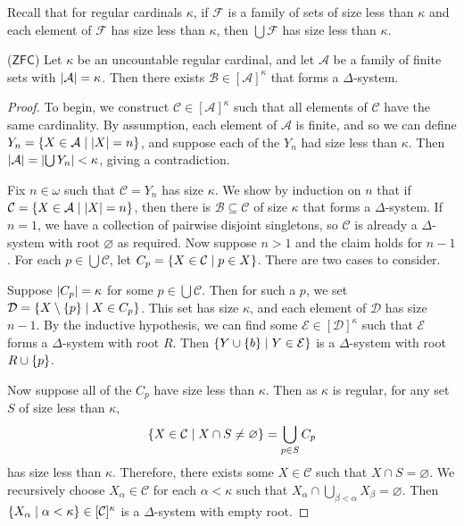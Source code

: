 Recall that for regular cardinals \( \kappa \), if \( \mathcal F \) is a family of sets of size less than \( \kappa \) and each element of \( \mathcal F \) has size less than \( \kappa \), then \( \bigcup \mathcal F \) has size less than \( \kappa \).
\begin{lemma}
    (\( \mathsf{ZFC} \))
    Let \( \kappa \) be an uncountable regular cardinal, and let \( \mathcal A \) be a family of finite sets with \( \abs{\mathcal A} = \kappa \).
    Then there exists \( \mathcal B \in [\mathcal A]^\kappa \) that forms a \( \Delta \)-system.
\end{lemma}
\begin{proof}
    To begin, we construct \( \mathcal C \in [\mathcal A]^\kappa \) such that all elements of \( \mathcal C \) have the same cardinality.
    By assumption, each element of \( \mathcal A \) is finite, and so we can define \( Y_n = \qty{X \in \mathcal A \mid \abs{X} = n} \), and suppose each of the \( Y_n \) had size less than \( \kappa \).
    Then \( \abs{\mathcal A} = \abs{\bigcup Y_n} < \kappa \), giving a contradiction.

    Fix \( n \in \omega \) such that \( \mathcal C = Y_n \) has size \( \kappa \).
    We show by induction on \( n \) that if \( \mathcal C = \qty{X \in \mathcal A \mid \abs{X} = n} \), then there is \( \mathcal B \subseteq \mathcal C \) of size \( \kappa \) that forms a \( \Delta \)-system.
    If \( n = 1 \), we have a collection of pairwise disjoint singletons, so \( \mathcal C \) is already a \( \Delta \)-system with root \( \varnothing \) as required.
    Now suppose \( n > 1 \) and the claim holds for \( n - 1 \).
    For each \( p \in \bigcup \mathcal C \), let \( C_p = \qty{X \in \mathcal C \mid p \in X} \).
    There are two cases to consider.

    Suppose \( \abs{C_p} = \kappa \) for some \( p \in \bigcup \mathcal C \).
    Then for such a \( p \), we set \( \mathcal D = \qty{X \setminus \qty{p} \mid X \in C_p} \).
    This set has size \( \kappa \), and each element of \( \mathcal D \) has size \( n - 1 \).
    By the inductive hypothesis, we can find some \( \mathcal E \in [\mathcal D]^\kappa \) such that \( \mathcal E \) forms a \( \Delta \)-system with root \( R \).
    Then \( \qty{Y \cup \qty{b} \mid Y \in \mathcal E} \) is a \( \Delta \)-system with root \( R \cup \qty{p} \).

    Now suppose all of the \( C_p \) have size less than \( \kappa \).
    Then as \( \kappa \) is regular, for any set \( S \) of size less than \( \kappa \),
    \[ \qty{X \in \mathcal C \mid X \cap S \neq \varnothing} = \bigcup_{p \in S} C_p \]
    has size less than \( \kappa \).
    Therefore, there exists some \( X \in \mathcal C \) such that \( X \cap S = \varnothing \).
    We recursively choose \( X_\alpha \in \mathcal C \) for each \( \alpha < \kappa \) such that \( X_\alpha \cap \bigcup_{\beta < \alpha} X_\beta = \varnothing \).
    Then \( \qty{X_\alpha \mid \alpha < \kappa} \in [\mathcal C]^\kappa \) is a \( \Delta \)-system with empty root.
\end{proof}
